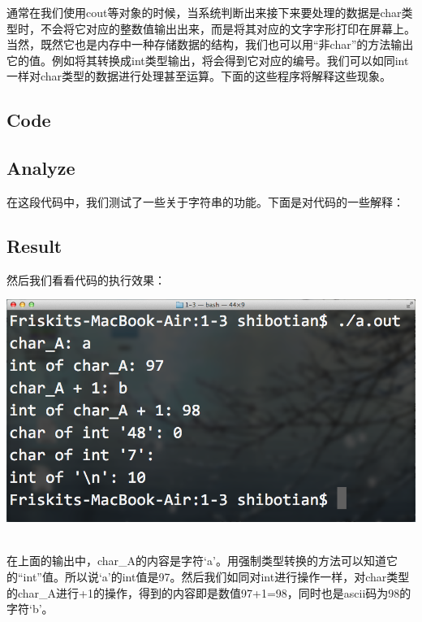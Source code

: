 通常在我们使用cout等对象的时候，当系统判断出来接下来要处理的数据是char类型时，不会将它对应的整数值输出出来，而是将其对应的文字字形打印在屏幕上。当然，既然它也是内存中一种存储数据的结构，我们也可以用“非char”的方法输出它的值。例如将其转换成int类型输出，将会得到它对应的编号。我们可以如同int一样对char类型的数据进行处理甚至运算。下面的这些程序将解释这些现象。

\subsection{Code}



\subsection{Analyze}
在这段代码中，我们测试了一些关于字符串的功能。下面是对代码的一些解释：
\begin{quote}
\showremarks
\end{quote}

\subsection{Result}
然后我们看看代码的执行效果：
\\[\intextsep] 
  \begin{minipage}{\textwidth} 
    \centering 
    \includegraphics{codes/1-3/result.png}
    \label{fig:code-1-3-result} 
  \end{minipage} 
\\[\intextsep] 

在上面的输出中，char\_A的内容是字符‘a’。用强制类型转换的方法可以知道它的“int”值。所以说‘a’的int值是97。然后我们如同对int进行操作一样，对char类型的char\_A进行+1的操作，得到的内容即是数值97+1=98，同时也是ascii码为98的字符‘b’。

